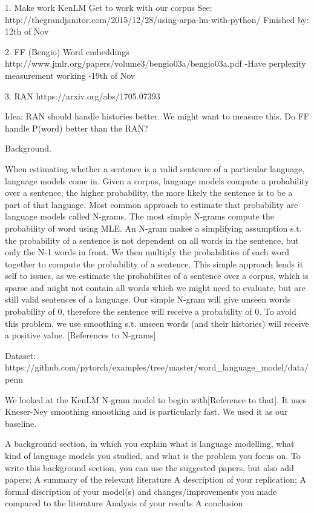 

1. Make  work KenLM
Get to work with our corpus
See: http://thegrandjanitor.com/2015/12/28/using-arpa-lm-with-python/
Finished by: 12th of Nov

2. FF (Bengio)
Word embeddings
http://www.jmlr.org/papers/volume3/bengio03a/bengio03a.pdf
-Have perplexity measurement working
-19th of Nov

3. RAN
https://arxiv.org/abs/1705.07393


Idea:
RAN should handle histories better. We might want to measure this.
Do FF handle P(word) better than the RAN?

Background.

When estimating whether a sentence is a valid sentence of a particular language, language models come in.
Given a corpus, language models compute a probability over a sentence, the higher probability, the more likely the sentence is to be a part of that language. Most common approach to estimate that probability are language models called N-grams. The most simple N-grams compute the probability of word using MLE. An N-gram makes a simplifying assumption s.t. the probability of a sentence is not dependent on all words in the sentence, but only the N-1 words in front. We then multiply the probabilities of each word together to compute the probability of a sentence. This simple approach lends it self to issues, as we estimate the probabilites of a sentence over a corpus, which is sparse and might not contain all words which we might need to evaluate, but are still valid sentences of a language. Our simple N-gram will give unseen words probability of 0, therefore the sentence will receive a probability of 0. To avoid this problem, we use smoothing s.t. unseen words (and their histories) will receive a positive value. [References to N-grams]

Dataset: https://github.com/pytorch/examples/tree/master/word_language_model/data/penn

We looked at the KenLM N-gram model to begin with[Reference to that]. It uses Kneser-Ney smoothing smoothing and is particularly fast. We used it as our baseline.

A background section, in which you explain what is language modelling, what kind of language models you studied, and what is the problem you focus on. To write this background section, you can use the suggested papers, but also add papers;
A summary of the relevant literature
A description of your replication;
A formal discription of your model(s) and changes/improvements you made compared to the literature
Analysis of your results
A conclusion



